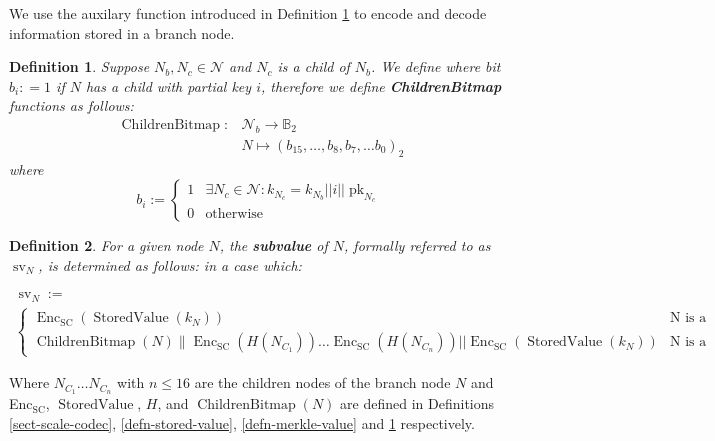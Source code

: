 \documentclass{article}
\newcommand{\assign}{:=}
\newcommand{\nobracket}{}
\newcommand{\tmop}[1]{\ensuremath{\operatorname{#1}}}
\newcommand{\tmrsub}[1]{\ensuremath{_{\textrm{#1}}}}
\newcommand{\tmstrong}[1]{\textbf{#1}}
\newcommand{\tmtextbf}[1]{{\bfseries{#1}}}
\newtheorem{definition}{Definition}
\providecommand{\nobracket}{}
\providecommand{\tmop}[1]{\ensuremath{\mathrm{#1}}}
\providecommand{\tmrsub}[1]{\tmrsub{\ensuremath{\mathrm{#1}}}}
\providecommand{\tmstrong}[1]{\tmtextbf{#1}}
\providecommand{\tmtextbf}[1]{\tmtextbf{#1}}
\newtheorem{definition}{Definition}
\begin{document}
We use the auxilary function introduced in Definition
\ref{defn-children-bitmap} to encode and decode information stored in a branch
node.

\begin{definition}
  \label{defn-children-bitmap}Suppose $N_b, N_c \in \mathcal{N}$ and $N_c$ is
  a child of $N_b$. We define where bit $b_i : = 1$ if $N$ has a child with
  partial key $i$, therefore we define {\tmstrong{ChildrenBitmap}} functions
  as follows:
  \[ \begin{array}{cc}
       \tmop{ChildrenBitmap} : & \mathcal{N}_b \rightarrow \mathbb{B}_2\\
       & N \mapsto (b_{15}, \ldots, b_8, b_7, \ldots b_0)_2
     \end{array} \]
  where
  \[ b_i \assign \left\{ \begin{array}{cc}
       1 & \exists N_c \in \mathcal{N}: k_{N_c} = k_{N_b} | | i | |
       \tmop{pk}_{N_c}\\
       0 & \text{otherwise}
     \end{array} \right. \]
\end{definition}

\begin{definition}
  \label{defn-node-subvalue}For a given node $N$, the {\tmstrong{subvalue}} of
  $N$, formally referred to as $\tmop{sv}_N$, is determined as follows: in a
  case which:
  \begin{itemize}
    \[ \begin{array}{l}
         \tmop{sv}_N \assign\\
         \left\{ \begin{array}{cc}
           \tmop{Enc}_{\tmop{SC}} (\tmop{StoredValue} (k_N)) & \text{N is a
           leaf node}\\
           \nobracket \tmop{ChildrenBitmap} (N)\| \tmop{Enc}_{\tmop{SC}} (H
           (N_{C_1})) \ldots \tmop{Enc}_{\tmop{SC}} (H (N_{C_n})) | |
           \tmop{Enc}_{\tmop{SC}} (\tmop{StoredValue} (k_N))  & \text{N is a
           branch node}
         \end{array} \right.
       \end{array} \]
  \end{itemize}
\end{definition}

Where $N_{C_1} \ldots N_{C_n}$ with $n \leqslant 16$ are the children nodes of
the branch node $N$ and Enc\tmrsub{SC}, $\tmop{StoredValue}$, $H$, and
$\tmop{ChildrenBitmap} (N)$ are defined in Definitions \ref{sect-scale-codec},
\ref{defn-stored-value}, \ref{defn-merkle-value} and
\ref{defn-children-bitmap} respectively.
\end{document}

